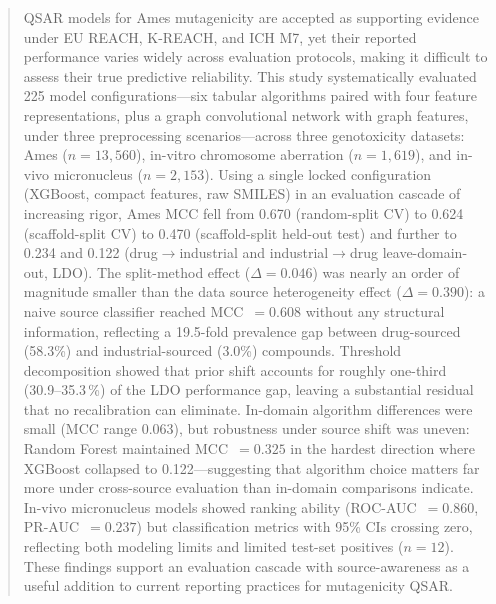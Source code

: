 \begin{abstract}
QSAR models for Ames mutagenicity are accepted as supporting evidence under EU REACH, 
K-REACH, and ICH M7, yet their reported performance varies widely across evaluation 
protocols, making it difficult to assess their true predictive 
reliability.\cite{Honma_2019,Furuhama_2023,Wu_MoleculeNet_2018} This study systematically 
evaluated 225 model configurations---six tabular algorithms paired with four feature 
representations, plus a graph convolutional network with graph features, under three 
preprocessing scenarios---across three genotoxicity datasets: Ames ($n = 13{,}560$), 
in-vitro chromosome aberration ($n = 1{,}619$), and in-vivo micronucleus ($n = 2{,}153$). 
Using a single locked configuration (XGBoost, compact features, raw SMILES) in an evaluation 
cascade of increasing rigor, Ames MCC fell from 0.670 (random-split CV) to 0.624 
(scaffold-split CV) to 0.470 (scaffold-split held-out test) and further to 0.234 and 0.122 
(drug$\to$industrial and industrial$\to$drug leave-domain-out, LDO). The split-method effect 
($\Delta = 0.046$) was nearly an order of magnitude smaller than the data source 
heterogeneity effect ($\Delta = 0.390$): a naive source classifier reached 
MCC~$= 0.608$ without any structural information, reflecting a 19.5-fold prevalence gap 
between drug-sourced (58.3\%) and industrial-sourced (3.0\%) compounds. Threshold 
decomposition showed that prior shift accounts for roughly one-third (30.9--35.3\,\%) of the 
LDO performance gap, leaving a substantial residual that no recalibration can eliminate. In-domain algorithm differences were small (MCC range 0.063), but 
robustness under source shift was uneven: Random Forest maintained MCC~$= 0.325$ in the 
hardest direction where XGBoost collapsed to 0.122---suggesting that algorithm choice 
matters far more under cross-source evaluation than in-domain comparisons indicate. In-vivo 
micronucleus models showed ranking ability (ROC-AUC~$= 0.860$, PR-AUC~$= 0.237$) but 
classification metrics with 95\% CIs crossing zero, reflecting both modeling limits and 
limited test-set positives ($n = 12$). These findings support an evaluation cascade with 
source-awareness as a useful addition to current reporting practices for mutagenicity QSAR.
\end{abstract}
